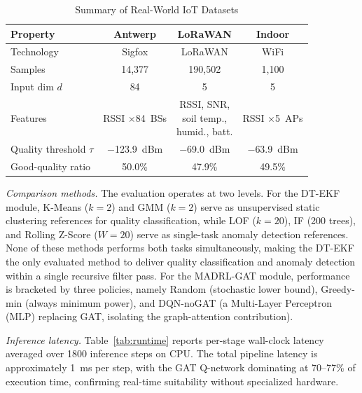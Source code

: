 \documentclass[conference]{IEEEtran}
\begin{document}
\begin{table}[t]
\centering
\caption{Summary of Real-World IoT Datasets}
\label{tab:datasets}
\setlength{\tabcolsep}{4pt}
\renewcommand{\arraystretch}{1.15}
\begin{tabular}{lccc}
\toprule
\textbf{Property}        & \textbf{Antwerp}           & \textbf{LoRaWAN}           & \textbf{Indoor}           \\
\midrule
Technology               & Sigfox      & LoRaWAN     & WiFi          \\
Samples                  & 14,377                     & 190,502                    & 1,100                     \\
Input dim $d$            & 84                         & 5                          & 5                         \\
Features                 & \shortstack[c]{RSSI\\$\times$84~BSs}
                         & \shortstack[c]{RSSI, SNR,\\soil temp.,\\humid., batt.}
                         & \shortstack[c]{RSSI\\$\times$5~APs}                     \\
Quality threshold $\tau$ & $-$123.9~dBm               & $-$69.0~dBm                & $-$63.9~dBm               \\
Good-quality ratio       & 50.0\%                     & 47.9\%                     & 49.5\%                    \\
\bottomrule
\end{tabular}
\end{table}

\textit{Comparison methods.}
The evaluation operates at two levels. For the DT-EKF module,
K-Means ($k=2$) and GMM ($k=2$) serve as unsupervised static clustering
references for quality classification, while LOF ($k=20$), IF (200 trees), and Rolling Z-Score ($W=20$) serve as single-task anomaly
detection references. None of these methods performs both tasks simultaneously, making the DT-EKF
the only evaluated method to deliver quality classification and anomaly
detection within a single recursive filter pass.
For the MADRL-GAT module, performance is bracketed by three policies, namely Random (stochastic lower bound), Greedy-min (always minimum power), and DQN-noGAT (a Multi-Layer Perceptron (MLP) replacing GAT, isolating the graph-attention contribution).

\textit{Inference latency.}
Table~\ref{tab:runtime} reports per-stage wall-clock latency averaged over 1800 inference steps on CPU.
The total pipeline latency is approximately 1~ms per step, with the GAT Q-network dominating at 70--77\% of execution time, confirming real-time suitability without specialized hardware.
\end{document}
